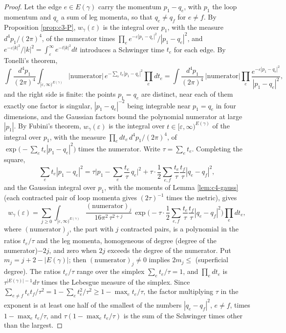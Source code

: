 \begin{proof}
Let the edge $e\in E(\gamma)$ carry the momentum $p_1-q_e$, with $p_1$ the loop momentum and $q_e$ a sum of leg momenta, so that $q_e\neq q_f$ for $e\neq f$. By Proposition \ref{prop:c3-P}, $w_\gamma(\varepsilon)$ is the integral over $p_1$, with the measure $d^4p_1/(2\pi)^4$, of the numerator times $\prod_ee^{-\varepsilon|p_1-q_e|^2}/|p_1-q_e|^2$, and $e^{-\varepsilon|k|^2}/|k|^2=\int_\varepsilon^\infty e^{-t|k|^2}dt$ introduces a Schwinger time $t_e$ for each edge. By Tonelli's theorem,
\[
\int\frac{d^4p_1}{(2\pi)^4}\int_{[\varepsilon,\infty)^{E(\gamma)}}\big|\text{numerator}\big|\,e^{-\sum_et_e|p_1-q_e|^2}\prod_edt_e=\int\frac{d^4p_1}{(2\pi)^4}\,\big|\text{numerator}\big|\prod_e\frac{e^{-\varepsilon|p_1-q_e|^2}}{|p_1-q_e|^2},
\]
and the right side is finite: the points $p_1=q_e$ are distinct, near each of them exactly one factor is singular, $|p_1-q_e|^{-2}$ being integrable near $p_1=q_e$ in four dimensions, and the Gaussian factors bound the polynomial numerator at large $|p_1|$. By Fubini's theorem, $w_\gamma(\varepsilon)$ is the integral over $t\in[\varepsilon,\infty)^{E(\gamma)}$ of the integral over $p_1$, with the measure $\prod_edt_e\,d^4p_1/(2\pi)^4$, of $\exp\big(-\sum_et_e|p_1-q_e|^2\big)$ times the numerator. Write $\tau=\sum_et_e$. Completing the square,
\[
\sum_et_e|p_1-q_e|^2=\tau\Big|p_1-\sum_e\frac{t_e}{\tau}\,q_e\Big|^2+\tau\cdot\frac12\sum_{e,f}\frac{t_e}{\tau}\frac{t_f}{\tau}|q_e-q_f|^2 ,
\]
and the Gaussian integral over $p_1$, with the moments of Lemma \ref{lem:c4-gauss} (each contracted pair of loop momenta gives $(2\tau)^{-1}$ times the metric), gives
\[
w_\gamma(\varepsilon)=\sum_{j\ge0}\int_{[\varepsilon,\infty)^{E(\gamma)}}\frac{(\text{numerator})_j}{16\pi^2\,\tau^{2+j}}\,\exp\Big(-\tau\cdot\frac12\sum_{e,f}\frac{t_e}{\tau}\frac{t_f}{\tau}|q_e-q_f|^2\Big)\prod_edt_e ,
\]
where $(\text{numerator})_j$, the part with $j$ contracted pairs, is a polynomial in the ratios $t_e/\tau$ and the leg momenta, homogeneous of degree (degree of the numerator)$-2j$, and zero when $2j$ exceeds the degree of the numerator. Put $m_j=j+2-|E(\gamma)|$; then $(\text{numerator})_j\neq0$ implies $2m_j\le$ (superficial degree). The ratios $t_e/\tau$ range over the simplex $\sum_et_e/\tau=1$, and $\prod_edt_e$ is $\tau^{|E(\gamma)|-1}d\tau$ times the Lebesgue measure of the simplex. Since $\sum_{e\neq f}t_et_f/\tau^2=1-\sum_et_e^2/\tau^2\ge1-\max_et_e/\tau$, the factor multiplying $\tau$ in the exponent is at least one half of the smallest of the numbers $|q_e-q_f|^2$, $e\neq f$, times $1-\max_et_e/\tau$, and $\tau(1-\max_et_e/\tau)$ is the sum of the Schwinger times other than the largest.


\end{proof}
